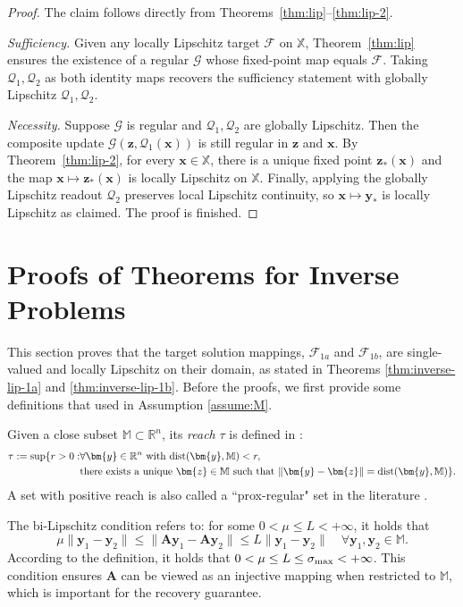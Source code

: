 \documentclass{amsart} %
\def\vx{{\bm{x}}}
\def\vy{{\bm{y}}}
\def\vz{{\bm{z}}}
\def\mA{{\bm{A}}}
\def\sM{{\mathbb{M}}}
\def\sR{{\mathbb{R}}}
\def\sX{{\mathbb{X}}}
\def\cF{{\mathcal{F}}}
\def\cG{{\mathcal{G}}}
\def\cQ{{\mathcal{Q}}}
\theoremstyle{definition}
\theoremstyle{remark}
\begin{document}
\begin{proof}
The claim follows directly from Theorems~\ref{thm:lip}–\ref{thm:lip-2}.

\emph{Sufficiency.} Given any locally Lipschitz target $\cF$ on $\sX$, Theorem~\ref{thm:lip} ensures the existence of a regular $\cG$ whose fixed-point map equals $\cF$. Taking $\cQ_1,\cQ_2$ as both identity maps recovers the sufficiency statement with globally Lipschitz $\cQ_1,\cQ_2$.

\emph{Necessity.} Suppose $\cG$ is regular and $\cQ_1,\cQ_2$ are globally Lipschitz. Then the composite update $\cG(\vz,\cQ_1(\vx))$ is still regular in $\vz$ and $\vx$. By Theorem~\ref{thm:lip-2}, for every $\vx\in\sX$, there is a unique fixed point $\vz_\ast(\vx)$ and the map $\vx \mapsto \vz_\ast(\vx)$ is locally Lipschitz on $\sX$. Finally, applying the globally Lipschitz readout $\cQ_2$ preserves local Lipschitz continuity, so $\vx \mapsto \vy_\ast$ is locally Lipschitz as claimed.
The proof is finished.
\end{proof}


\section{Proofs of Theorems for Inverse Problems}
\label{sec:app-inv}

This section proves that the target solution mappings, $\cF_{1a}$ and $\cF_{1b}$, are single-valued and locally Lipschitz on their domain, as stated in Theorems \ref{thm:inverse-lip-1a} and \ref{thm:inverse-lip-1b}. Before the proofs, we first provide some definitions that used in Assumption \ref{assume:M}.

Given a close subset $\sM \subset \sR^n$, its \textit{reach} $\tau$ is defined in \cite{federer1959curvature}:
\begin{align*}
\tau := \sup \{  r>0: & \forall \vy \in \sR^n \textup{ with dist}(\vy,\sM)<r,  \\
& \textup{there exists a unique }\vz \in \sM \textup{ such that }\|\vy - \vz\| = \textup{dist}(\vy,\sM) \}.
\end{align*}
A set with positive reach is also called a ``prox-regular" set in the literature \cite{poliquin2000local}.

The bi-Lipschitz condition refers to: for some $0 < \mu \leq L < +\infty$, it holds that
\begin{equation}
\label{eq:JL-condition}
\mu \|\vy_1-\vy_2\| \leq \|\mA \vy_1 - \mA \vy_2\| \leq L \|\vy_1-\vy_2\| \quad \forall \vy_1,\vy_2 \in \sM.
\end{equation}
According to the definition, it holds that $0 < \mu \leq L \leq \sigma_{\textup{max}} < +\infty$. 
This condition ensures $\mA$ can be viewed as an injective mapping when restricted to $\sM$, which is important for the recovery guarantee.
\end{document}
